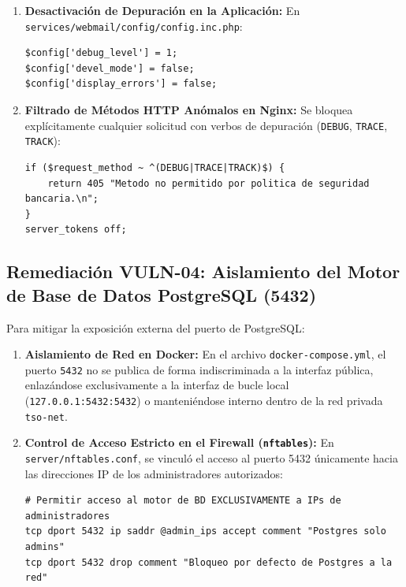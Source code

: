 \begin{enumerate}
  \item \textbf{Desactivación de Depuración en la Aplicación:} En \texttt{services/webmail/config/config.inc.php}:
\begin{lstlisting}[style=terminal, caption={Desactivacion de Modo Debug en Roundcube Webmail}, label={lst:mitigacion-debug}]
$config['debug_level'] = 1;
$config['devel_mode'] = false;
$config['display_errors'] = false;
\end{lstlisting}

  \item \textbf{Filtrado de Métodos HTTP Anómalos en Nginx:} Se bloquea explícitamente cualquier solicitud con verbos de depuración (\texttt{DEBUG}, \texttt{TRACE}, \texttt{TRACK}):
\begin{lstlisting}[style=terminal, caption={Bloqueo de Metodos HTTP de Depuracion en Nginx}, label={lst:mitigacion-verbos}]
if ($request_method ~ ^(DEBUG|TRACE|TRACK)$) {
    return 405 "Metodo no permitido por politica de seguridad bancaria.\n";
}
server_tokens off;
\end{lstlisting}
\end{enumerate}

\subsection{Remediación VULN-04: Aislamiento del Motor de Base de Datos PostgreSQL (5432)}

Para mitigar la exposición externa del puerto de PostgreSQL:

\begin{enumerate}
  \item \textbf{Aislamiento de Red en Docker:} En el archivo \texttt{docker-compose.yml}, el puerto \texttt{5432} no se publica de forma indiscriminada a la interfaz pública, enlazándose exclusivamente a la interfaz de bucle local (\texttt{127.0.0.1:5432:5432}) o manteniéndose interno dentro de la red privada \texttt{tso-net}.
  \item \textbf{Control de Acceso Estricto en el Firewall (\texttt{nftables}):} En \texttt{server/nftables.conf}, se vinculó el acceso al puerto 5432 únicamente hacia las direcciones IP de los administradores autorizados:
\begin{lstlisting}[style=terminal, caption={Regla de Acceso a PostgreSQL en nftables.conf}, label={lst:mitigacion-nftables-db}]
# Permitir acceso al motor de BD EXCLUSIVAMENTE a IPs de administradores
tcp dport 5432 ip saddr @admin_ips accept comment "Postgres solo admins"
tcp dport 5432 drop comment "Bloqueo por defecto de Postgres a la red"
\end{lstlisting}
\end{enumerate}

